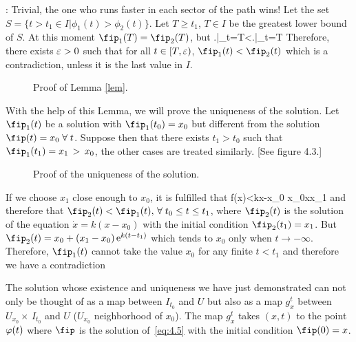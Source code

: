 \espa


\pru: Trivial, the one who runs faster in each sector of the path wins!
Let the set $S = \{t>t_1 \in I | \phi_1(t) > \phi_2(t)\}$. 
Let $T \geq t_1$, $T \in I$ be the greatest lower bound of $S$.
 At this moment
$\fip_1(T)=\fip_2(T)$, 
but 
\beq 
\left.\right|_{t=T}<\left.\right|_{t=T}
\eeq 
%
Therefore, there exists $\mbox{$\varepsilon$} > 0$ such that for all $t \in [T,\mbox{$\varepsilon$})$, 
$\fip_1(t)<\fip_2(t)$ which is
a contradiction, unless it is the last value in $I$.

\begin{figure}[htbp]
  \begin{center}
    \caption{Proof of Lemma \ref{lem}.}
    \label{fig:4_2}
  \end{center}
\end{figure}

With the help of this Lemma, we will prove the uniqueness of the solution.
Let $\fip_1(t)$ be a solution with $\fip_1(t_0)=x_0$ but different from
the solution $\fip(t)=x_0\;\forall\;t$. 
Suppose then that there exists
$t_1>t_0$ such that $\fip_1(t_1)=x_1\,>\,x_0$, the other cases are
treated similarly. [See figure 4.3.] 
\begin{figure}[htbp]
  \begin{center}
    \caption{Proof of the uniqueness of the solution.}
    \label{fig:4_2_b}
  \end{center}
\end{figure}

If we choose $x_1$ close enough to $x_0$, it is fulfilled that
\beq 
f(x)<k\mid x-x_0\mid\;\;\forall \;\; x_0\leq x\leq x_1
\eeq 
and therefore that $\fip_2(t) < \fip_1(t),\,\forall\;t_0\leq
t\leq t_1$, where $\fip_2(t)$ is the solution of the equation $\dot
x= k(x-x_0)$ with the initial condition $\fip_2(t_1)=x_1$. 
But $\fip_2(t)=x_0+(x_1-x_0)\, \mbox{e}^{k(t-t_1)}$ which tends to $x_0$
only when $t\to -\infty$. Therefore, $\fip_1(t)$ cannot take the value
$x_0$ for any finite $t < t_1$ and therefore we have a
contradiction \epru

The solution whose existence and uniqueness we have just demonstrated can
not only be thought of as a map between $I_{t_0}$ and $U$ but also
as a map $g_x^t$ between $U_{x_0}\times\,I_{t_0}$ and $U$ 
($U_{x_0}$ neighborhood of $x_0$). The map $g_x^t$ takes $(x,t)$ to the point
$\mbox{$\varphi (t)$}$ where $\fip$ is the solution of~\ref{eq:4.5} with the initial
condition $\fip (0)=x$.

